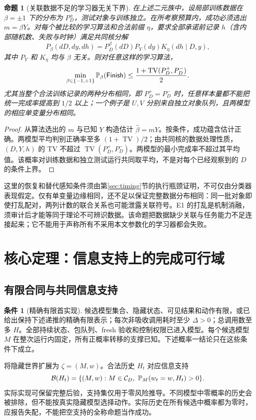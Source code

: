 \documentclass[11pt,a4paper,fontset=fandol]{ctexart}
\newtheorem{proposition}[theorem]{命题}
\theoremstyle{definition}
\newtheorem{assumption}[theorem]{条件}
\theoremstyle{remark}\newtheorem{remark}[theorem]{说明}
\numberwithin{equation}{section}
\newcommand{\TV}{\operatorname{TV}}\newcommand{\supp}{\operatorname{supp}}
\newcommand{\Finish}{\mathsf{Finish}}\newcommand{\Win}{\mathsf{Win}}
\begin{document}
\begin{proposition}[关联数据不足的学习器无关下界]
\label{prop:train_lower}
在上述二元族中，设局部训练数据在 $\beta=\pm1$ 下的分布为 $P_D^\pm$，测试对象与训练独立。在所考察预算内，成功必须选出 $m=\beta Y$。对每个被比较的学习算法和合法前缀 $\eta$，要求全部承诺前记录 $h$（含内部随机数、失败与时钟）满足共同核分解
\[
 P_\beta(dD,dy,dh)=P_D^\beta(dD)P_Y(dy)K_\eta(dh\mid D,y),
\]
其中 $P_Y$ 和 $K_\eta$ 均与 $\beta$ 无关。则对任意这样的学习算法，
\begin{equation}
 \min_{\beta\in\{-1,+1\}}\Prb_\beta(\Finish)
 \le \frac{1+\TV(P_D^+,P_D^-)}{2}.
 \label{eq:train_lower}
\end{equation}
尤其当整个合法训练记录的两种分布相同，即 $P_D^+=P_D^-$ 时，任意样本量都不能把统一完成率提高到 $1/2$ 以上；一个例子是 $U,V$ 分别来自独立对象队列，且两模型的相应单变量分布相同。
\end{proposition}
\begin{proof}
从算法选出的 $m$ 与已知 $Y$ 构造估计 $\widehat\beta=mY$。按条件，成功蕴含估计正确。两模型平均判别正确率至多 $(1+\TV)/2$；由共同核的数据处理性质，$(D,Y,h)$ 的 TV 不超过 $\TV(P_D^+,P_D^-)$。两模型的最小完成率不超过其平均值。该概率对训练数据和独立测试运行共同取平均，不是对每个已经观察到的 $D$ 的条件上界。
\end{proof}
这里的恢复和替代感知条件须由第\ref{sec:timing}节的执行瓶颈证明，不可仅由分类器表现假定。仅有单变量边缘相同，还不足以保证完整数据分布相同：同一批对象即使打乱配对，两列计数的联合关系也可能泄露关联符号。E1 的打乱是机制消融，须审计后才能等同于理论不可辨识数据。该命题把数据缺少关联与任务能力不足连接起来；它不能用于声称所有不采用本文参数化的学习器都会失败。

\section{核心定理：信息支持上的完成可行域}
\label{sec:support}
\subsection{有限合同与共同信息支持}
\begin{assumption}[精确有限首实现]
候选模型集合、隐藏状态、可见结果和动作有限，或已给出保持下述递推的精确有限表示；每次非吸收调用耗时至少 $\Delta>0$；总调用数至多 $H$。全部持续状态、包队列、fresh 验收和控制权限已进入模型。每个候选模型 $M$ 在整次运行内固定，所有正概率转移的支撑已知。下述概率一结论只在这些条件下成立。
\label{ass:finite}
\end{assumption}
将隐藏世界扩展为 $\zeta=(M,w)$。合法历史 $H_t$ 对应信息支持
\begin{equation}
 \cB(H_t)=\{(M,w):M\in\cC_D,\ \Prb_M(w_t=w,H_t)>0\}.
 \label{eq:belief_support}
\end{equation}
实际实现可保留完整后验，支持集仅用于零风险推导。不同模型中零概率的历史会被排除，但不能按真实隐藏模型选择动作。实际历史在所有候选中概率都为零时，应报告失配，不能把空支持的全称命题当作成功。
\end{document}
